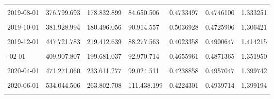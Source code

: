 \documentclass[12pt]{article}
\begin{document}
\begin{longtable}[t]{llllrrr}
\cellcolor{gray!10}{2019-07-01} & \cellcolor{gray!10}{372.490.492} & \cellcolor{gray!10}{176.890.435} & \cellcolor{gray!10}{75.744.629} & \cellcolor{gray!10}{0.4282008} & \cellcolor{gray!10}{0.4748858} & \cellcolor{gray!10}{1.372758}\\
2019-08-01 & 376.799.693 & 178.832.899 & 84.650.506 & 0.4733497 & 0.4746100 & 1.333251\\
\addlinespace
\cellcolor{gray!10}{2019-09-01} & \cellcolor{gray!10}{387.561.723} & \cellcolor{gray!10}{185.853.835} & \cellcolor{gray!10}{79.428.674} & \cellcolor{gray!10}{0.4273717} & \cellcolor{gray!10}{0.4795464} & \cellcolor{gray!10}{1.378553}\\
2019-10-01 & 381.928.994 & 180.496.056 & 90.914.557 & 0.5036928 & 0.4725906 & 1.306421\\
\cellcolor{gray!10}{2019-11-01} & \cellcolor{gray!10}{406.241.336} & \cellcolor{gray!10}{194.625.989} & \cellcolor{gray!10}{85.167.546} & \cellcolor{gray!10}{0.4375960} & \cellcolor{gray!10}{0.4790896} & \cellcolor{gray!10}{1.368817}\\
2019-12-01 & 447.721.783 & 219.412.639 & 88.277.563 & 0.4023358 & 0.4900647 & 1.414215\\
\cellcolor{gray!10}{2020-01-01} & \cellcolor{gray!10}{404.550.142} & \cellcolor{gray!10}{191.981.511} & \cellcolor{gray!10}{105.390.765} & \cellcolor{gray!10}{0.5489631} & \cellcolor{gray!10}{0.4745555} & \cellcolor{gray!10}{1.272333}\\
\addlinespace
2020-02-01 & 409.907.807 & 199.681.037 & 92.970.714 & 0.4655961 & 0.4871365 & 1.351950\\
\cellcolor{gray!10}{2020-03-01} & \cellcolor{gray!10}{435.822.892} & \cellcolor{gray!10}{221.617.254} & \cellcolor{gray!10}{93.354.608} & \cellcolor{gray!10}{0.4212425} & \cellcolor{gray!10}{0.5085030} & \cellcolor{gray!10}{1.417033}\\
2020-04-01 & 471.271.060 & 233.611.277 & 99.024.511 & 0.4238858 & 0.4957047 & 1.399742\\
\cellcolor{gray!10}{2020-05-01} & \cellcolor{gray!10}{503.444.375} & \cellcolor{gray!10}{246.472.095} & \cellcolor{gray!10}{111.090.589} & \cellcolor{gray!10}{0.4507228} & \cellcolor{gray!10}{0.4895717} & \cellcolor{gray!10}{1.367822}\\
2020-06-01 & 534.044.506 & 263.802.708 & 111.438.199 & 0.4224301 & 0.4939714 & 1.399194\\
\addlinespace
\cellcolor{gray!10}{2020-07-01} & \cellcolor{gray!10}{546.432.508} & \cellcolor{gray!10}{266.621.350} & \cellcolor{gray!10}{143.863.544} & \cellcolor{gray!10}{0.5395800} & \cellcolor{gray!10}{0.4879310} & \cellcolor{gray!10}{1.289745}\\

\end{longtable}
\end{document}
